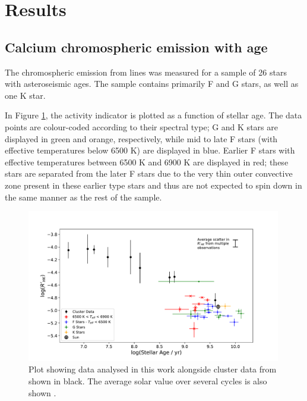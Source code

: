 \section{Results}
\label{Chp4_results}

\subsection{Calcium chromospheric emission with age}
\label{Chp4_results_general_results}
The chromospheric emission from \caII lines was measured for a sample of 26 stars with asteroseismic ages. The sample contains primarily F and G stars, as well as one K star.

In Figure \ref{fig:calcium_emission_plot}, the \Rprime activity indicator is plotted as a function of stellar age. The data points are colour-coded according to their spectral type; G and K stars are displayed in green and orange, respectively, while mid to late F stars (with effective temperatures below 6500 K) are displayed in blue. Earlier F stars with effective temperatures between 6500 K and 6900 K are displayed in red; these stars are separated from the later F stars due to the very thin outer convective zone present in these earlier type stars and thus are not expected to spin down in the same manner as the rest of the sample.

\begin{figure}[h]
	\includegraphics[width=0.99\textwidth]{Figures/4-Chromospheric_age/ca_results_with_clusters.pdf}
	\caption[Calcium emission as a function of age for sample and cluster data]{Plot showing data analysed in this work alongside cluster data from \citet{Mamajek_Hillenbrand_2008} shown in black. The average solar value over several cycles is also shown \citep{Egeland_etal_2017}.}
	\centering
	\label{fig:calcium_emission_plot}
\end{figure}

